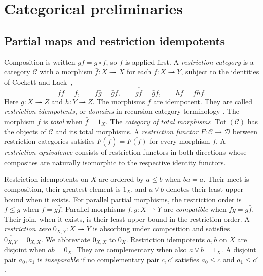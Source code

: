 \section{Categorical preliminaries}\label{sec:preliminaries}

\subsection{Partial maps and restriction idempotents}\label{subsec:restriction-idempotents}

Composition is written $gf=g\circ f$, so $f$ is applied first.
A \emph{restriction category} is a category $\mathcal C$ with a
morphism $\bar f:X\rightharpoonup X$ for each $f:X\rightharpoonup Y$,
subject to the identities of Cockett and Lack~\cite[Section~2.1.1]{CockettLack},
\[
 f\bar f=f,\qquad
 \bar f\bar g=\bar g\bar f,\qquad
 \overline{g\bar f}=\bar g\bar f,\qquad
 \bar h f=f\overline{hf}.
\]
Here $g:X\rightharpoonup Z$ and $h:Y\rightharpoonup Z$.
The morphisms $\bar f$ are idempotent. They are called
\emph{restriction idempotents}, or \emph{domains} in
recursion-category terminology \cite[Section~5]{Heller}.
The morphism $f$ is \emph{total} when $\bar f=1_X$.
The \emph{category of total morphisms} $\operatorname{Tot}(\mathcal C)$
has the objects of $\mathcal C$ and its total morphisms.
A \emph{restriction functor} $F:\mathcal C\to\mathcal D$ between
restriction categories satisfies $F(\bar f)=\overline{F(f)}$ for every
morphism $f$. A \emph{restriction equivalence} consists of restriction
functors in both directions whose composites are naturally isomorphic
to the respective identity functors.

Restriction idempotents on $X$ are ordered by $a\le b$ when $ba=a$.
Their meet is composition, their greatest element is $1_X$, and
$a\vee b$ denotes their least upper bound when it exists.
For parallel partial morphisms, the restriction order is
$f\le g$ when $f=g\bar f$.
Parallel morphisms $f,g:X\rightharpoonup Y$ are \emph{compatible} when
$f\bar g=g\bar f$. Their join, when it exists, is their least upper
bound in the restriction order.
A \emph{restriction zero} $0_{X,Y}:X\rightharpoonup Y$ is
absorbing under composition and satisfies
$\overline{0_{X,Y}}=0_{X,X}$. We abbreviate $0_{X,X}$ to $0_X$.
Restriction idempotents $a,b$ on $X$ are disjoint when $ab=0_X$.
They are complementary when also $a\vee b=1_X$.
A disjoint pair $a_0,a_1$ is \emph{inseparable} if no complementary
pair $c,c'$ satisfies $a_0\le c$ and $a_1\le c'$.

